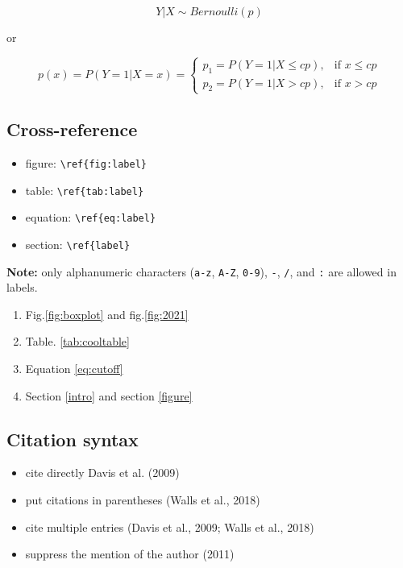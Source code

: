 \documentclass[review]{elsarticle} %
\providecommand{\tightlist}{%
  \setlength{\itemsep}{0pt}\setlength{\parskip}{0pt}}
\begin{document}
\[Y|X \sim Bernoulli(p)\]

or

\begin{equation}
\label{eq:cutoff}
p(x) = P(Y = 1|X = x) = 
\left\{
    \begin{array}{lr}
          p_1 = P(Y = 1|X \le cp), & \text{if } x \le cp\\
          p_2 = P(Y = 1|X > cp), & \text{if } x > cp
    \end{array}
\right.
\end{equation}

\subsection{Cross-reference}\label{cross-reference}

\begin{itemize}
\tightlist
\item
  figure: \texttt{\textbackslash{}ref\{fig:label\}}
\item
  table: \texttt{\textbackslash{}ref\{tab:label\}}
\item
  equation: \texttt{\textbackslash{}ref\{eq:label\}}
\item
  section: \texttt{\textbackslash{}ref\{label\}}
\end{itemize}

\textbf{Note:} only alphanumeric characters (\texttt{a-z}, \texttt{A-Z},
\texttt{0-9}), \texttt{-}, \texttt{/}, and \texttt{:} are allowed in
labels.

\begin{enumerate}
\def\labelenumi{\arabic{enumi}.}
\tightlist
\item
  Fig.\ref{fig:boxplot} and fig.\ref{fig:2021}
\item
  Table. \ref{tab:cooltable}
\item
  Equation \ref{eq:cutoff}
\item
  Section \ref{intro} and section \ref{figure}
\end{enumerate}

\subsection{Citation syntax}\label{citation-syntax}

\begin{itemize}
\tightlist
\item
  cite directly Davis et al. (2009)
\item
  put citations in parentheses (Walls et al., 2018)
\item
  cite multiple entries (Davis et al., 2009; Walls et al., 2018)
\item
  suppress the mention of the author (2011)
\end{itemize}
\end{document}
